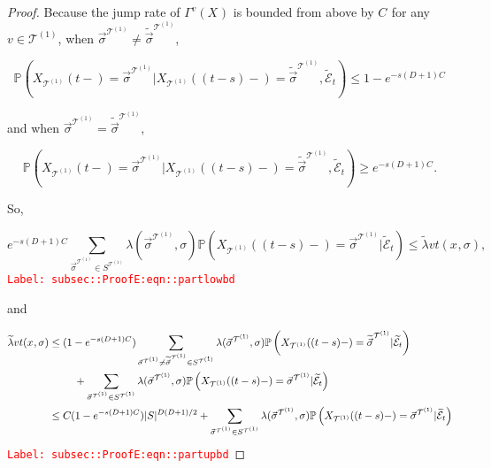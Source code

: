 \documentclass[12pt]{article}
\newcommand{\mb}{\mathbb}
\newcommand{\mc}{\mathcal}
\newcommand{\tr}{\textcolor{red}}
\newcommand{\labe}[1]{\tr{\texttt{Label: #1}}}
\newcommand{\pr}{\mb{P}}							%
\renewcommand{\v}{v}							%
\renewcommand{\S}{S}							%
\newcommand{\s}{\sigma}							%
\newcommand{\sv}{\vec{\s}}						%
\newcommand{\x}{x}								%
\renewcommand{\t}{t}							%
\renewcommand{\tt}{s}							%
\newcommand{\X}{X}								%
\newcommand{\vind}[1]{^{#1}}					%
\newcommand{\carp}[1]{^{#1}}					%
\newcommand{\vsi}[1]{^{#1}}						%
\newcommand{\cind}[1]{_{#1}}					%
\newcommand{\tp}[1]{(#1)}						%
\newcommand{\tip}[1]{#1}						%
\newcommand{\ts}[1]{_{#1}}						%
\newcommand{\const}{C}							%
\newcommand{\degr}{D}							%
\newcommand{\tree}{\mc{T}}						%
\newcommand{\sln}[1]{^{(#1)}}					%
\newcommand{\rate}{\lambda}						%
\newcommand{\alt}[1]{\widetilde{#1}}			%
\newcommand{\indx}[1]{_{#1}}					%
\newcommand{\evnt}{\mc{E}}						%
\newcommand{\pmap}{\Gamma}						%
\newcommand{\crate}{\alt{\lambda}}				%
\begin{document}
\begin{proof}
Because the jump rate of \(\pmap\vind{\v}(\X\cind{}\tip{})\) is bounded from above by \(\const\indx{}\) for any \(\v\in\tree\sln{1}\),  when \(\sv\cind{}\vsi{\tree\sln{1}}\neq\alt{\sv}\cind{}\vsi{\tree\sln{1}}\), 

\[\pr\left(\X\cind{\tree\sln{1}}\tp{\t-} = \sv\cind{}\vsi{\tree\sln{1}}|\X\cind{\tree\sln{1}}\tp{(\t-\tt)-}=\alt{\sv}\cind{}\vsi{\tree\sln{1}},\alt{\evnt}\ts{\t}\right) \leq 1-e^{-\tt(\degr+1)\const\indx{}}\]

and when \(\sv\cind{}\vsi{\tree\sln{1}}=\alt{\sv}\cind{}\vsi{\tree\sln{1}}\),

\[\pr\left(\X\cind{\tree\sln{1}}\tp{\t-} = \sv\cind{}\vsi{\tree\sln{1}}|\X\cind{\tree\sln{1}}\tp{(\t-\tt)-}=\alt{\sv}\cind{}\vsi{\tree\sln{1}},\alt{\evnt}\ts{\t}\right) \geq e^{-\tt(\degr+1)\const\indx{}}.\]

So,

\begin{equation}
e^{-\tt(\degr+1)\const\indx{}}\sum_{\sv\cind{}\vsi{\tree\sln{1}}\in \S\carp{\tree\sln{1}}} \rate{}(\sv\cind{}\vsi{\tree\sln{1}},\s)\pr\left(\X\cind{\tree\sln{1}}\tp{(\t-\tt)-}=\sv\cind{}\vsi{\tree\sln{1}}|\alt{\evnt}\ts{\t}\right) \leq \crate{\v}{\t}(\x\cind{}\tip{},\s),
\label{subsec::ProofE:eqn::partlowbd}
\end{equation}
\labe{subsec::ProofE:eqn::partlowbd}

and

\begin{align}
\crate{\v}{\t}(\x\cind{}\tip{},\s)&\leq (1 - e^{-\tt(\degr+1)\const\indx{}})\sum_{\sv\cind{}\vsi{\tree\sln{1}}\neq \alt{\sv}\cind{}\vsi{\tree\sln{1}} \in \S\carp{\tree\sln{1}}} \rate{}(\sv\cind{}\vsi{\tree\sln{1}},\s)\pr\left(\X\cind{\tree\sln{1}}\tp{(\t-\tt)-}=\alt{\sv}\cind{}\vsi{\tree\sln{1}}|\alt{\evnt}\ts{\t}\right)\nonumber\\
&\hspace{24 pt} +\sum_{\sv\cind{}\vsi{\tree\sln{1}} \in \S\carp{\tree\sln{1}}} \rate{}(\sv\cind{}\vsi{\tree\sln{1}},\s)\pr\left(\X\cind{\tree\sln{1}}\tp{(\t-\tt)-}=\sv\cind{}\vsi{\tree\sln{1}}|\alt{\evnt}\ts{\t}\right)\nonumber\\
&\leq \const\indx{}(1 - e^{-\tt(\degr+1)\const\indx{}})|\S|^{\degr(\degr+1)/2} + \sum_{\sv\cind{}\vsi{\tree\sln{1}} \in \S\carp{\tree\sln{1}}} \rate{}(\sv\cind{}\vsi{\tree\sln{1}},\s)\pr\left(\X\cind{\tree\sln{1}}\tp{(\t-\tt)-}=\sv\cind{}\vsi{\tree\sln{1}}|\alt{\evnt}\ts{\t}\right)
\label{subsec::ProofE:eqn::partupbd}
\end{align}
\labe{subsec::ProofE:eqn::partupbd}


\end{proof}
\end{document}
